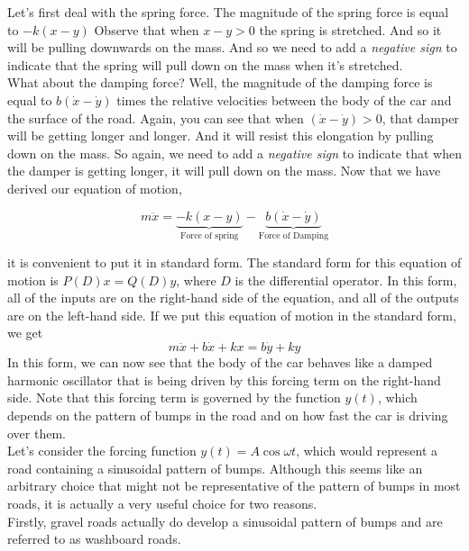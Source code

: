 Let's first deal with the spring force.
The magnitude of the spring force
is equal to $-k(x - y)$
Observe that when $x - y > 0$ the spring is stretched.
And so it will be pulling downwards on the mass.
And so we need to add a \textit{negative sign}
to indicate that the spring will pull down on the mass when it's stretched.\\
What about the damping force?
Well, the magnitude of the damping force
is equal to $b(\dot x - \dot y)$ times the relative velocities between the body
of the car and the surface of the road. 
Again, you can see that when $(\dot x - \dot y) > 0$, that damper will
be getting longer and longer.
And it will resist this elongation by pulling down on the mass.
So again, we need to add a \textit{negative sign} to indicate that when the damper is getting longer,
it will pull down on the mass.
Now that we have derived our equation of motion,

\begin{equation*}
  m \ddot x = \underbrace{-k(x - y)}_{\text{Force of spring}}
  - \underbrace{b(\dot x - \dot y)}_{\text{Force of Damping}}
\end{equation*}

it is convenient to put it in standard form.
The standard form for this equation of motion
is $P(D)x = Q(D)y$, where $D$ is the differential operator. 
In this form, all of the inputs are on the right-hand side
of the equation, and all of the outputs are on the left-hand side.
If we put this equation of motion in the standard form,
we get
\begin{equation*}
  m \ddot x + b \dot x + kx = b \dot y + k y
\end{equation*}
In this form, we can now see that the body of the car
behaves like a damped harmonic oscillator that
is being driven by this forcing term on the right-hand side.
Note that this forcing term is governed
by the function $y(t)$, which depends on the pattern of bumps
in the road and on how fast the car is driving over them.\\

Let's consider the forcing function $y(t) = A \cos \omega t$, which would
represent a road containing a sinusoidal pattern of bumps.
Although this seems like an arbitrary choice that might not
be representative of the pattern of bumps in most roads,
it is actually a very useful choice for two reasons.\\

Firstly, gravel roads actually do develop a sinusoidal pattern of bumps
and are referred to as washboard roads.\\

